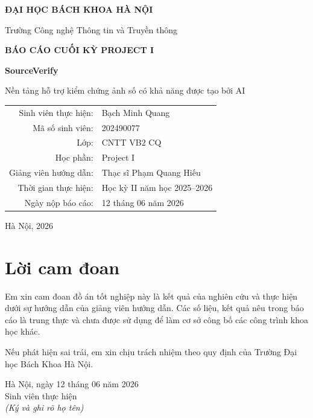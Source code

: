 \begin{titlepage}
\centering
{\Large\bfseries ĐẠI HỌC BÁCH KHOA HÀ NỘI\par}
\vspace{0.35cm}
{\large Trường Công nghệ Thông tin và Truyền thông\par}
\vspace{1.8cm}
{\Large\bfseries BÁO CÁO CUỐI KỲ PROJECT I\par}
\vspace{0.8cm}
{\Huge\bfseries SourceVerify\par}
\vspace{0.35cm}
{\Large Nền tảng hỗ trợ kiểm chứng ảnh số có khả năng được tạo bởi AI\par}
\vspace{1.6cm}
\begin{tabular}{rl}
Sinh viên thực hiện: & Bạch Minh Quang \\
Mã số sinh viên: & 202490077 \\
Lớp: & CNTT VB2 CQ \\
Học phần: & Project I \\
Giảng viên hướng dẫn: & Thạc sĩ Phạm Quang Hiếu \\
Thời gian thực hiện: & Học kỳ II năm học 2025--2026 \\
Ngày nộp báo cáo: & 12 tháng 06 năm 2026 \\
\end{tabular}
\vfill
{\large Hà Nội, 2026\par}
\end{titlepage}

\chapter*{Lời cam đoan}
Em xin cam đoan đồ án tốt nghiệp này là kết quả của nghiên cứu và thực hiện dưới sự hướng dẫn của giảng viên hướng dẫn. Các số liệu, kết quả nêu trong báo cáo là trung thực và chưa được sử dụng để làm cơ sở công bố các công trình khoa học khác.

Nếu phát hiện sai trái, em xin chịu trách nhiệm theo quy định của Trường Đại học Bách Khoa Hà Nội.

\begin{flushright}
Hà Nội, ngày 12 tháng 06 năm 2026\\
\vspace{1cm}
Sinh viên thực hiện\\
\textit{(Ký và ghi rõ họ tên)}
\end{flushright}

